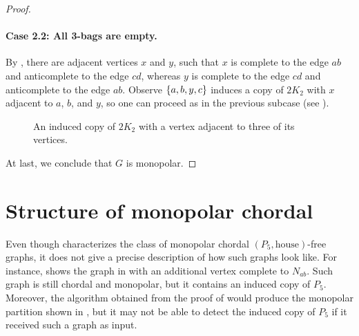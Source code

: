 \begin{proof}
    \paragraph{Case 2.2: All 3-bags are empty.} By
    , there are adjacent vertices $x$ and $y$,
    such that $x$ is complete to the edge $ab$ and anticomplete to the edge
    $cd$, whereas $y$ is complete to the edge $cd$ and anticomplete to the edge
    $ab$. Observe $\left\{a,b,y,c\right\}$ induces a copy of $2K_2$ with $x$ adjacent to
    $a$, $b$, and $y$, so one can proceed as in the previous subcase (see
    ).

    \begin{figure}[htb!]
        \centering
        \caption{An induced copy of $2K_2$ with a vertex adjacent to three of its vertices.}
        \label{fig:chordal_final}
    \end{figure}

    At last, we conclude that $G$ is monopolar.

\end{proof}

\section{Structure of monopolar chordal}
\label{sec:structure_chordal}

Even though  characterizes the class of monopolar
chordal $(P_5,\text{house})$-free graphs, it does not give a precise description
of how such graphs look like. For instance,  shows
the graph in  with an additional vertex
complete to $N_{ab}$. Such graph is still chordal and monopolar, but it contains
an induced copy of $P_5$. Moreover, the algorithm obtained from the proof of
 would produce the monopolar partition shown in
, but it may not be able to detect the induced copy
of $P_5$ if it received such a graph as input.

